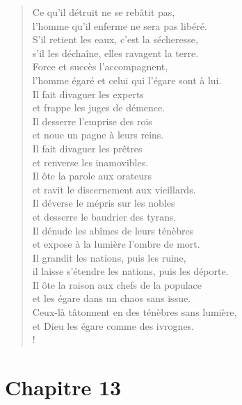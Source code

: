 \documentclass[french,twoside]{book} %
\def\mednobreak{\ifdim\lastskip<\medskipamount
  \removelastskip\nopagebreak\medskip\fi}
\newcommand{\labelblock}[1]{\medbreak{\noindent\color{rubric}\bfseries #1}\par\mednobreak}
\newcommand\chapteropen{} %
\newcommand\chaptercont{} %
\newcommand\chapterclose{} %
\begin{document}
\begin{verse}
Ce qu’il détruit ne se rebâtit pas, \\
l’homme qu’il enferme ne sera pas libéré.\\
S’il retient les eaux, c’est la sécheresse, \\
s’il les déchaîne, elles ravagent la terre.\\
Force et succès l’accompagnent, \\
l’homme égaré et celui qui l’égare sont à lui.\\
Il fait divaguer les experts \\
et frappe les juges de démence.\\
Il desserre l’emprise des rois \\
et noue un pagne à leurs reins.\\
Il fait divaguer les prêtres \\
et renverse les inamovibles.\\
Il ôte la parole aux orateurs \\
et ravit le discernement aux vieillards.\\
Il déverse le mépris sur les nobles \\
et desserre le baudrier des tyrans.\\
Il dénude les abîmes de leurs ténèbres \\
et expose à la lumière l’ombre de mort.\\
Il grandit les nations, puis les ruine, \\
il laisse s’étendre les nations, puis les déporte.\\
Il ôte la raison aux chefs de la populace \\
et les égare dans un chaos sans issue.\\
Ceux-là tâtonnent en des ténèbres sans lumière, \\
et Dieu les égare comme des ivrognes.\\!
\end{verse}
\chapterclose


\chapteropen
\chapter[Chapitre 13]{Chapitre 13}\renewcommand{\leftmark}{Chapitre 13}


\chaptercont

\labelblock{Plâtriers de mensonge}
\end{document}
